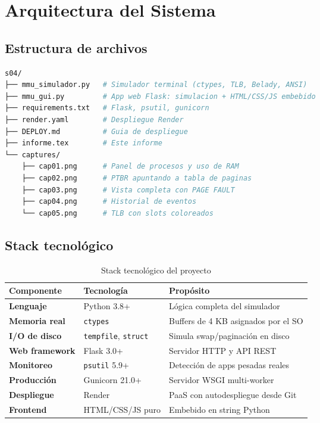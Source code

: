 \documentclass[12pt,a4paper]{article}
\begin{document}
\newpage

\section{Arquitectura del Sistema}

\subsection{Estructura de archivos}

\begin{lstlisting}[language=bash, caption=Estructura del proyecto]
s04/
├── mmu_simulador.py   # Simulador terminal (ctypes, TLB, Belady, ANSI)
├── mmu_gui.py         # App web Flask: simulacion + HTML/CSS/JS embebido
├── requirements.txt   # Flask, psutil, gunicorn
├── render.yaml        # Despliegue Render
├── DEPLOY.md          # Guia de despliegue
├── informe.tex        # Este informe
└── captures/
    ├── cap01.png      # Panel de procesos y uso de RAM
    ├── cap02.png      # PTBR apuntando a tabla de paginas
    ├── cap03.png      # Vista completa con PAGE FAULT
    ├── cap04.png      # Historial de eventos
    └── cap05.png      # TLB con slots coloreados
\end{lstlisting}

\subsection{Stack tecnológico}

\begin{table}[H]
\centering
\begin{tabular}{>{\bfseries}lll}
\toprule
Componente & Tecnología & Propósito \\
\midrule
Lenguaje & Python 3.8+ & Lógica completa del simulador \\
Memoria real & \texttt{ctypes} & Buffers de 4 KB asignados por el SO \\
I/O de disco & \texttt{tempfile}, \texttt{struct} & Simula swap/paginación en disco \\
Web framework & Flask 3.0+ & Servidor HTTP y API REST \\
Monitoreo & \texttt{psutil} 5.9+ & Detección de apps pesadas reales \\
Producción & Gunicorn 21.0+ & Servidor WSGI multi-worker \\
Despliegue & Render & PaaS con autodespliegue desde Git \\
Frontend & HTML/CSS/JS puro & Embebido en string Python \\
\bottomrule
\end{tabular}
\caption{Stack tecnológico del proyecto}
\end{table}
\end{document}
